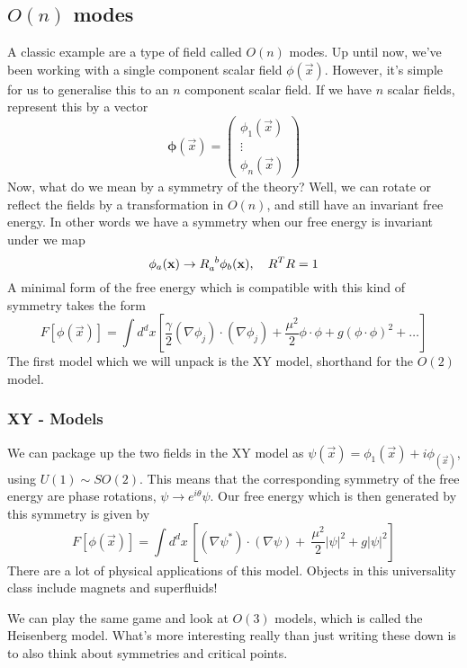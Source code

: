 \subsection{$ O ( n ) $ modes} 
A classic example are a type of field called 
$ O ( n ) $ modes. Up until now, 
we've been working with a single component 
scalar field $ \phi ( \vec{x} ) $. However, it's simple 
for us to generalise this to an $ n $ component scalar field. If we have $ n $ scalar fields, 
represent this by a vector 
\[
	\mathbf{ \phi } ( \vec{x} )  = \begin{pmatrix}  
	\phi _ 1 ( \vec{x} ) \\ \vdots \\ \phi _ n ( \vec{x} )  \end{pmatrix} 
\] Now, what do we mean by a symmetry of the theory? 
Well, we can rotate or reflect the fields by a transformation in 
$ O ( n ) $, and still have 
an invariant free energy. In other words we have a symmetry
when our free energy is invariant under we map 
\[
	\phi _ a ( \vec{x} ) \to R \indices{_ a ^ b } \phi _ b ( \vec{x} ) , \quad R ^ T  R = 1 
\]  A minimal form of the free energy which is 
compatible with this kind of symmetry takes the form 
\[
	F [ \phi ( \vec{x} ) ] = 
	\int d ^ d x \left[ 
	\frac{ \gamma }{ 2 } ( \nabla \phi _ j ) \cdot  ( \nabla \phi _ j ) +  \frac{\mu ^ 2 }{ 2}
\phi \cdot  \phi + g ( \phi \cdot  \phi ) ^ 2 + \dots \right] 
\] 
The first model which we will unpack is the XY model, shorthand 
for the $ O ( 2) $ model. 


\subsubsection{XY - Models} 
We can package up the two fields in the XY model 
as $ \psi ( \vec{x} )  = \phi _  1 ( \vec{x} )  + i \phi_ ( \vec{x} ) $, 
using $ U ( 1 ) \sim SO ( 2) $. 
This means that the corresponding symmetry of the 
free energy are phase rotations, $ \psi \to e^{ i \theta } \psi $. 
Our free energy which is then generated by this symmetry is 
given by 
\[
 F [ \phi ( \vec{x} ) ] = \int  d^ d x \, 
 \left[  ( \nabla \psi ^ * ) \cdot  ( \nabla \psi ) + \
\frac{\mu ^ 2 }{ 2 } | \psi | ^ 2 + g | \psi | ^ 2\right] 
\] There are a lot of physical applications of this model. 
Objects in this universality class include magnets and superfluids! 

We can play the same game and look at $ O ( 3 ) $ models, which is called the 
Heisenberg model. 
What's more interesting really than just writing these down is to 
also think about symmetries and critical points. 

